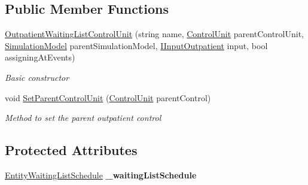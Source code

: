 \subsection*{Public Member Functions}
\begin{DoxyCompactItemize}
\item 
\hyperlink{class_general_health_care_elements_1_1_department_models_1_1_outpatient_1_1_waiting_list_1_1_out0eb5e03b9183fdbdabb1cbe4530cecf4_ab613592c6ed357bac8571a23237380f5}{Outpatient\+Waiting\+List\+Control\+Unit} (string name, \hyperlink{class_simulation_core_1_1_h_c_c_m_elements_1_1_control_unit}{Control\+Unit} parent\+Control\+Unit, \hyperlink{class_simulation_core_1_1_simulation_classes_1_1_simulation_model}{Simulation\+Model} parent\+Simulation\+Model, \hyperlink{interface_general_health_care_elements_1_1_department_models_1_1_outpatient_1_1_i_input_outpatient}{I\+Input\+Outpatient} input, bool assigning\+At\+Events)
\begin{DoxyCompactList}\small\item\em Basic constructor \end{DoxyCompactList}\item 
void \hyperlink{class_general_health_care_elements_1_1_department_models_1_1_outpatient_1_1_waiting_list_1_1_out0eb5e03b9183fdbdabb1cbe4530cecf4_ad3adf0eac43d3e7d1939892da7a885df}{Set\+Parent\+Control\+Unit} (\hyperlink{class_simulation_core_1_1_h_c_c_m_elements_1_1_control_unit}{Control\+Unit} parent\+Control)
\begin{DoxyCompactList}\small\item\em Method to set the parent outpatient control \end{DoxyCompactList}\end{DoxyCompactItemize}
\subsection*{Protected Attributes}
\begin{DoxyCompactItemize}
\item 
\hyperlink{class_general_health_care_elements_1_1_booking_models_1_1_entity_waiting_list_schedule}{Entity\+Waiting\+List\+Schedule} {\bfseries \+\_\+waiting\+List\+Schedule}\hypertarget{class_general_health_care_elements_1_1_department_models_1_1_outpatient_1_1_waiting_list_1_1_out0eb5e03b9183fdbdabb1cbe4530cecf4_aba0faebec0aef7249e9ce8cd0638e7d4}{}\label{class_general_health_care_elements_1_1_department_models_1_1_outpatient_1_1_waiting_list_1_1_out0eb5e03b9183fdbdabb1cbe4530cecf4_aba0faebec0aef7249e9ce8cd0638e7d4}

\end{DoxyCompactItemize}
